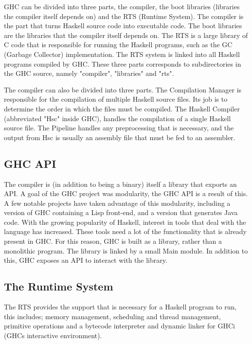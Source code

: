 GHC can be divided into three parts, the compiler, the boot libraries
(libraries the compiler itself depends on) and the RTS (Runtime System). 
The compiler is the part
that turns Haskell source code into executable code. The boot libraries are the 
libraries that the compiler itself depends on. The RTS is a large library
of C code that is responsible for running the Haskell programs, such as the 
GC (Garbage Collector) implementation. The RTS system is linked into all 
Haskell programs compiled by GHC. These three parts corresponds to subdirectories
in the GHC source, namely "compiler", "libraries" and "rts".
\cite{marlow2012glasgow}

The compiler can also be divided into three parts. The Compilation Manager is 
responsible for the compilation of multiple Haskell source files. Its job is to
determine the order in which the files must be compiled. The Haskell Compiler 
(abbreviated "Hsc" inside GHC), handles the compilation of a single Haskell source
file. The Pipeline handles any preprocessing that is necessary, and the output
from Hsc is usually an assembly file that must be fed to an assembler.
\cite{marlow2012glasgow}


\subsection*{GHC API}

The compiler is (in addition to being a binary) itself a library that exports an API.
A goal of the GHC project was modularity, the GHC API is a result of this. 
A few notable projects have taken advantage of this modularity,
including a version of GHC containing a Lisp front-end, and a version that generates
Java code. With the growing popularity of Haskell, interest in tools that deal with
the language has increased. These tools need a lot of the functionality that is already
present in GHC. For this reason, GHC is built as a library, rather than a monolithic
program. The library is linked by a small Main module. In addition to this, GHC
exposes an API to interact with the library.\cite{marlow2012glasgow} 

\subsection*{The Runtime System}

The RTS provides the support that is necessary for a Haskell program to run, this
includes; memory management, scheduling and thread management, primitive operations
and a bytecode interpreter and dynamic linker for GHCi (GHCs interactive environment).
\cite{marlow2012glasgow} 

